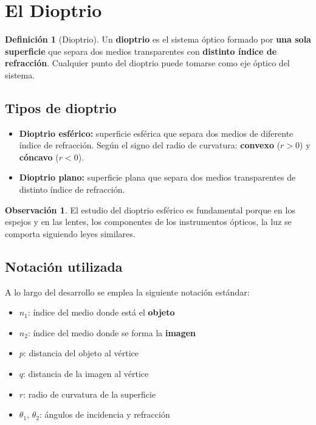 \documentclass[12pt, a4paper]{article}
\theoremstyle{definition}
\newtheorem{definicion}{Definición}[section]
\newtheorem{observacion}{Observación}[section]
\begin{document}
\section{El Dioptrio}

\begin{definicion}[Dioptrio]
Un \textbf{dioptrio} es el sistema óptico formado por \textbf{una sola superficie} que
separa dos medios transparentes con \textbf{distinto índice de refracción}. Cualquier
punto del dioptrio puede tomarse como eje óptico del sistema.
\end{definicion}

\subsection{Tipos de dioptrio}

\begin{itemize}
  \item \textbf{Dioptrio esférico:} superficie esférica que separa dos medios de diferente
        índice de refracción. Según el signo del radio de curvatura: \textbf{convexo}
        (\(r > 0\)) y \textbf{cóncavo} (\(r < 0\)).
  \item \textbf{Dioptrio plano:} superficie plana que separa dos medios transparentes de
        distinto índice de refracción.
\end{itemize}

\begin{observacion}
El estudio del dioptrio esférico es fundamental porque en los espejos y en las lentes, los
componentes de los instrumentos ópticos, la luz se comporta siguiendo leyes similares.
\end{observacion}

\subsection{Notación utilizada}

A lo largo del desarrollo se emplea la siguiente notación estándar:

\begin{itemize}
  \item \(n_1\): índice del medio donde está el \textbf{objeto}
  \item \(n_2\): índice del medio donde se forma la \textbf{imagen}
  \item \(p\): distancia del objeto al vértice
  \item \(q\): distancia de la imagen al vértice
  \item \(r\): radio de curvatura de la superficie
  \item \(\theta_1,\, \theta_2\): ángulos de incidencia y refracción
\end{itemize}
\end{document}
